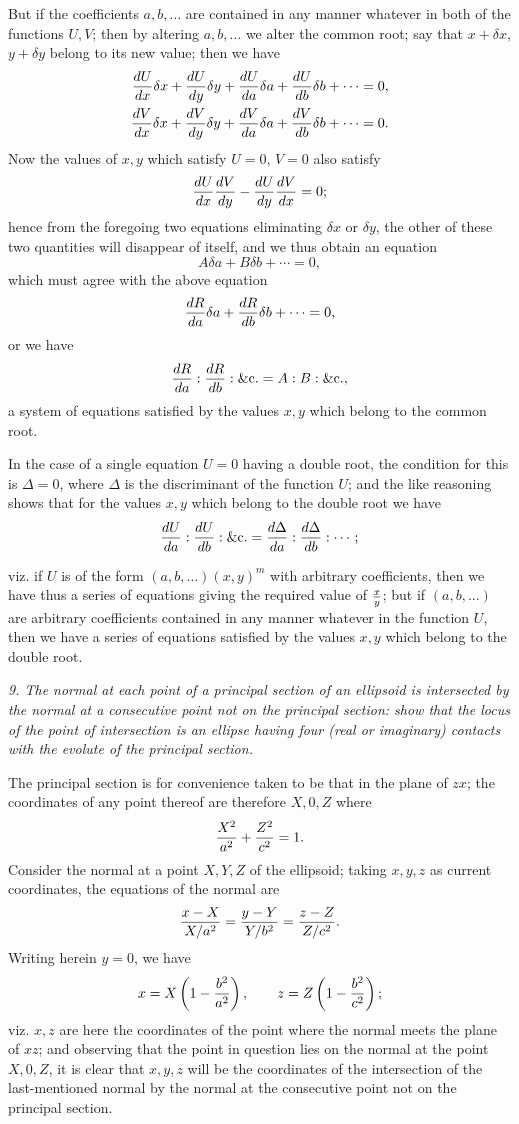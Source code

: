 \documentclass[11pt,a4paper]{article}
\theoremstyle{plain}
\theoremstyle{definition}
\newcommand{\bc}{\mathop{\&\mathrm{c}.}}
\begin{document}
But if the coefficients $a,b,\ldots$ are contained in any manner whatever in both of the functions $U,V$; then by altering $a,b,\ldots$ we alter the common root; say that $x+\delta x$, $y+\delta y$ belong to its new value; then we have
\[
\begin{aligned}
{dU\over dx}\delta x+{dU\over dy}\delta y+{dU\over da}\delta a+{dU\over db}\delta b+\cdots&=0,\\
{dV\over dx}\delta x+{dV\over dy}\delta y+{dV\over da}\delta a+{dV\over db}\delta b+\cdots&=0.
\end{aligned}
\]
Now the values of $x,y$ which satisfy $U=0$, $V=0$ also satisfy
\[
{dU\over dx}{dV\over dy}-{dU\over dy}{dV\over dx}=0;
\]
hence from the foregoing two equations eliminating $\delta x$ or $\delta y$, the other of these two quantities will disappear of itself, and we thus obtain an equation
\[
A\delta a+B\delta b+\cdots=0,
\]
which must agree with the above equation
\[
{dR\over da}\delta a+{dR\over db}\delta b+\cdots=0,
\]
or we have
\[
{dR\over da}:{dR\over db}:\bc=A:B:\bc,
\]
a system of equations satisfied by the values $x,y$ which belong to the common root.

In the case of a single equation $U=0$ having a double root, the condition for this is $\Delta=0$, where $\Delta$ is the discriminant of the function $U$; and the like reasoning shows that for the values $x,y$ which belong to the double root we have
\[
{dU\over da}:{dU\over db}:\bc={d\Delta\over da}:{d\Delta\over db}:\cdots;
\]

\newpage

viz. if $U$ is of the form $(a,b,\ldots)(x,y)^m$ with arbitrary coefficients, then we have thus a series of equations giving the required value of ${x\over y}$; but if $(a,b,\ldots)$ are arbitrary coefficients contained in any manner whatever in the function $U$, then we have a series of equations satisfied by the values $x,y$ which belong to the double root.

\medskip
\noindent\textit{9. The normal at each point of a principal section of an ellipsoid is intersected by the normal at a consecutive point not on the principal section: show that the locus of the point of intersection is an ellipse having four (real or imaginary) contacts with the evolute of the principal section.}

The principal section is for convenience taken to be that in the plane of $zx$; the coordinates of any point thereof are therefore $X,0,Z$ where
\[
{X^2\over a^2}+{Z^2\over c^2}=1.
\]
Consider the normal at a point $X,Y,Z$ of the ellipsoid; taking $x,y,z$ as current coordinates, the equations of the normal are
\[
{x-X\over X/a^2}={y-Y\over Y/b^2}={z-Z\over Z/c^2}.
\]
Writing herein $y=0$, we have
\[
x=X\left(1-{b^2\over a^2}\right),\qquad
z=Z\left(1-{b^2\over c^2}\right);
\]
viz. $x,z$ are here the coordinates of the point where the normal meets the plane of $xz$; and observing that the point in question lies on the normal at the point $X,0,Z$, it is clear that $x,y,z$ will be the coordinates of the intersection of the last-mentioned normal by the normal at the consecutive point not on the principal section.
\end{document}
